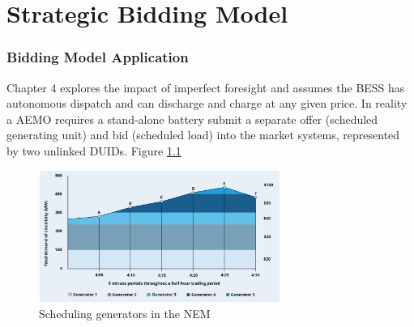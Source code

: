 \chapter{Strategic Bidding Model}
\subsection{ Bidding Model Application }
Chapter 4 explores the impact of imperfect foresight and assumes the BESS has autonomous dispatch and can discharge and charge at any given price. In reality a AEMO requires a stand-alone battery submit a separate offer (scheduled generating unit) and bid (scheduled load) into the market systems, represented by two unlinked DUIDs.
Figure \ref{fig:bidding_nem} 
\begin{figure}[H]
    \centering
    \includegraphics[width=0.7\textwidth]{Pictures/Chapter5/bidding.png}
    \caption{Scheduling generators in the NEM \parencite{AEMC_Bidding}}
    \label{fig:bidding_nem}
\end{figure}
